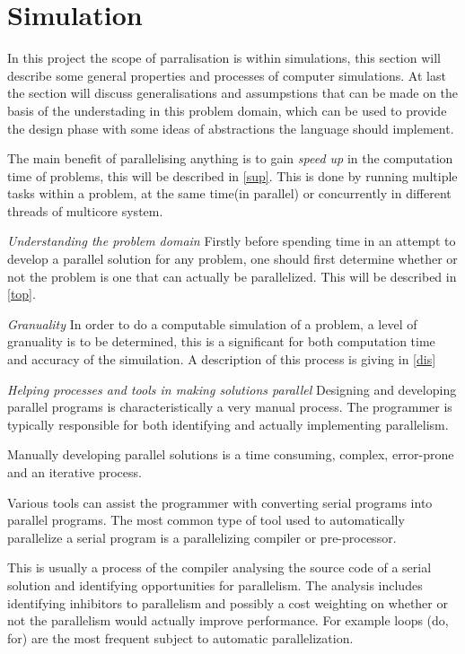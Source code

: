 \section{Simulation}

In this project the scope of parralisation is within simulations, this section will describe some general properties and processes of computer simulations. At last the section will discuss generalisations and assumpstions that can be made on the basis of the understading in this problem domain, which can be used to provide the design phase with some ideas of abstractions the language should implement.

The main benefit of parallelising anything is to gain \emph{speed up} in the computation time of problems, this will be described in \cref{sup}. This is done by running multiple tasks within a problem, at the same time(in parallel) or concurrently in different threads of multicore system.

\emph{Understanding the problem domain}
Firstly before spending time in an attempt to develop a parallel solution for any problem, one should first determine whether or not the problem is one that can actually be parallelized. This will be described in \cref{top}.

\emph{Granuality}
  In order to do a computable simulation of a problem, a level of granuality is to be determined, this is a significant for both computation time and accuracy of the simuilation. A description of this process is giving in \cref{dis}

\emph{Helping processes and tools in making solutions parallel}
    Designing and developing parallel programs is characteristically a very manual process. The programmer is typically responsible for both identifying and actually implementing parallelism.

    Manually developing parallel solutions is a time consuming, complex, error-prone and an iterative process.

    Various tools can assist the programmer with converting serial programs into parallel programs. The most common type of tool used to automatically parallelize a serial program is a parallelizing compiler or pre-processor.

    This is usually a process of the compiler analysing the source code of a serial solution and identifying opportunities for parallelism.
    The analysis includes identifying inhibitors to parallelism and possibly a cost weighting on whether or not the parallelism would actually improve performance.
    For example loops (do, for) are the most frequent subject to automatic parallelization.
